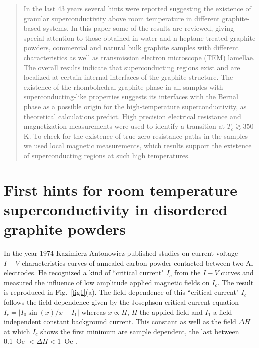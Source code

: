 \documentclass[aps,dvipsnames,twocolumn,floatfix,amsmath]{revtex4-1}
\begin{document}
\begin{abstract}
In the last 43 years several hints were reported suggesting the
existence of granular superconductivity above room temperature in
different graphite-based systems. In this paper some of the
results are reviewed, giving special attention to those obtained
in water and n-heptane treated graphite powders, commercial and
natural bulk graphite samples with different characteristics as
well as transmission electron microscope (TEM) lamellae. The
overall results indicate that superconducting regions exist and
are localized at certain internal interfaces of the graphite
structure. The existence of the rhombohedral graphite phase in all
samples with superconducting-like properties suggests its
interfaces with the Bernal phase as a possible origin for the
high-temperature superconductivity, as theoretical calculations
predict.  High precision  electrical resistance and magnetization
measurements were used to identify a transition at $T_c  \gtrsim
350~$K. To check for the existence of true zero resistance paths
in the samples we used local magnetic measurements, which results
support the existence of superconducting regions  at such high
temperatures.

\end{abstract}

\maketitle
\bigskip

\section{First hints for room temperature superconductivity in disordered graphite powders}
\label{intro}



In the year 1974 Kazimierz Antonowicz published studies
\cite{ant74} on current-voltage $I-V$ characteristics curves of
annealed carbon powder contacted between two Al electrodes. He
recognized a kind of ``critical current"  $I_c$ from the   $I-V$
curves and measured the influence of  low amplitude applied
magnetic fields on $I_c$. The result is reproduced in
Fig.~\ref{fig1}(a). The field dependence of this ``critical
current"  $I_c$ follows the field dependence given by the
Josephson critical current equation $I_c = |I_0  \sin(x)/x + I_1|$
whereas $x \propto H$, $H$ the applied field  and $I_1$ a
field-independent constant background current. This constant as
well as the field $\Delta H$ at which $I_c$ shows the first
minimum are sample dependent, the last between 0.1~Oe $< \Delta H
< 1$~Oe \cite{ant74}.
\end{document}
